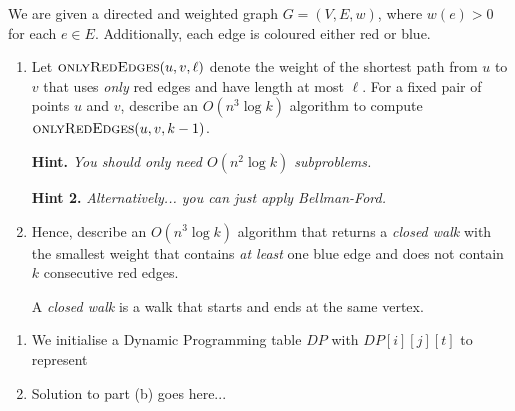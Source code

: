 \documentclass{article}
\begin{document}
\begin{question}
We are given a directed and weighted graph $G = (V, E, w)$, where $w(e) > 0$ for each $e \in E$. Additionally, each edge is coloured either red or blue.

\begin{enumerate}[label = (\alph*)]
    \item Let $\mathsf{\textsc{onlyRedEdges}}(u, v, \ell)$ denote the weight of the shortest path from $u$ to $v$ that uses {\em only} red edges and have length at most $\ell$. For a fixed pair of points $u$ and $v$, describe an $O(n^3 \log k)$ algorithm to compute $\mathsf{\textsc{onlyRedEdges}}(u, v, k - 1)$.

    {\bfseries Hint.} {\em You should only need $O(n^2 \log k)$ subproblems.}

    {\bfseries Hint 2.} {\em Alternatively... you can just apply Bellman-Ford.}

    \item Hence, describe an $O(n^3 \log k)$ algorithm that returns a {\em closed walk} with the smallest weight that contains {\em at least} one blue edge and does not contain $k$ consecutive red edges.

    A {\em closed walk} is a walk that starts and ends at the same vertex.
\end{enumerate}
\end{question}

\begin{solution}
\begin{enumerate}[label = (\alph*)]
    \item We initialise a Dynamic Programming table $DP$ with $DP[i][j][t]$ to represent 



    \item Solution to part (b) goes here...
\end{enumerate}
\end{solution}
\end{document}
